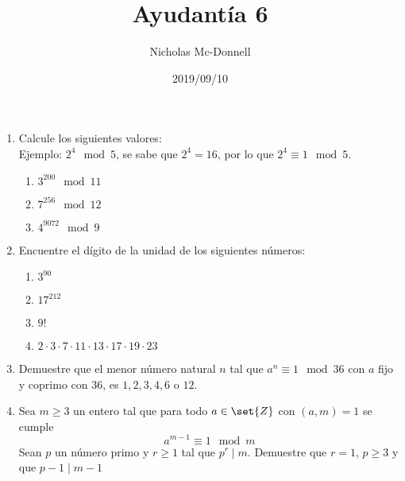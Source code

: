 \documentclass{ayudantia}
\title{Ayudantía 6}
\date{2019/09/10}
\author{Nicholas Mc-Donnell}
\begin{document}
\maketitle
\begin{enumerate}
    \item Calcule los siguientes valores:\\
          Ejemplo: \(2^4\mod 5\), se sabe que \(2^4=16\), por lo que \(2^4\equiv 1\mod 5\).
          \begin{enumerate}
              \item \(3^{200}\mod 11\)
              \item \(7^{256}\mod 12\)
              \item \(4^{9072}\mod 9\)
          \end{enumerate}
    \item Encuentre el dígito de la unidad de los siguientes números:
    \begin{enumerate}
        \item \(3^{90}\)
        \item \(17^{212}\)
        \item \(9!\)
        \item \(2\cdot 3\cdot 7\cdot 11\cdot 13\cdot 17\cdot 19\cdot 23\)
    \end{enumerate}
    \item Demuestre que el menor número natural \(n\) tal que \(a^n\equiv  1\mod 36\) con \(a\) fijo y coprimo con 36, es \(1,2,3,4,6\) o \(12\).
    \item Sea \(m\geq3\) un entero tal que para todo \(a\in\set{Z}\) con \((a,m)=1\) se cumple
          \[a^{m-1}\equiv 1\mod m\]
          Sean \(p\) un número primo y \(r\geq 1\) tal que \(p^r\mid m\). Demuestre que \(r=1\), \(p\geq3\) y que \(p-1\mid m-1\)
\end{enumerate}
\end{document}

